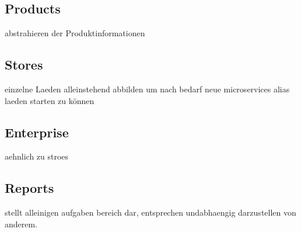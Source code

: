 		\subsection{Products}
		abstrahieren der Produktinformationen 
		
		\subsection{Stores}
		einzelne Laeden alleinstehend abbilden um nach bedarf neue microservices alias laeden starten zu können
		
		\subsection{Enterprise}
		aehnlich zu stroes
		
		\subsection{Reports}
		stellt alleinigen aufgaben bereich dar, entsprechen undabhaengig darzustellen von anderem.

